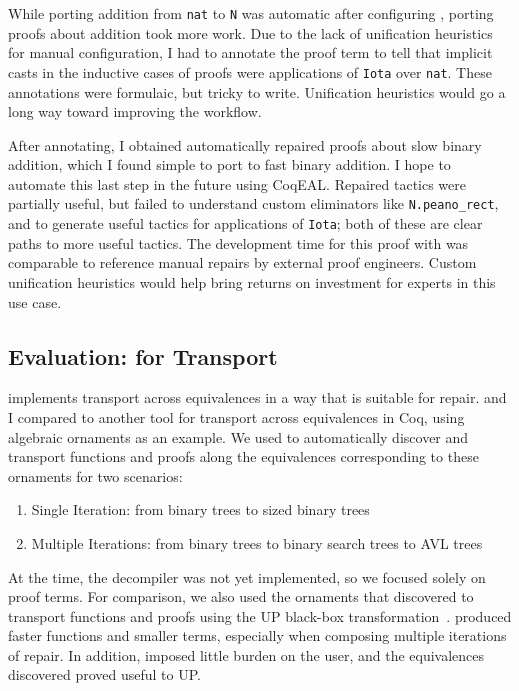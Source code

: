 While porting addition from \lstinline{nat} to \lstinline{N} was automatic after configuring \toolnamec,
porting proofs about addition took more work.
Due to the lack of unification heuristics for manual configuration,
I had to annotate the proof term to tell \toolnamec that implicit casts in the inductive cases of proofs were applications of \lstinline{Iota}
over \lstinline{nat}.
These annotations were formulaic, but tricky to write.
Unification heuristics would go a long way toward improving the workflow. %

After annotating, I obtained automatically repaired proofs about slow binary addition,
which I found simple to port to fast binary addition.
I hope to automate this last step in the future using CoqEAL. %
Repaired tactics were partially useful, but failed to understand custom eliminators like \lstinline{N.peano_rect}, and to generate useful
tactics for applications of \lstinline{Iota}; both of these are clear paths to more useful tactics.
The development time for this proof with \toolnamec was comparable to reference manual repairs by external proof engineers.
Custom unification heuristics would help bring returns on investment for experts in this use case.

\subsection{Evaluation: \toolnamec for Transport}
\label{sec:eval}

\toolnamec implements transport across equivalences in a way that is suitable for repair.
 and I compared \toolnamec to another tool for transport across equivalences in Coq,
using algebraic ornaments as an example.
We used \toolnamec to automatically discover and transport functions and proofs along the equivalences
corresponding to these ornaments for two scenarios:

\begin{enumerate}
\item Single Iteration: from binary trees to sized binary trees
\item Multiple Iterations: from binary trees to binary search trees to AVL trees
\end{enumerate}
At the time, the decompiler was not yet implemented, so we focused solely on proof terms.
For comparison, we also used the ornaments that \toolnamec discovered to transport functions
and proofs using the UP black-box transformation~\cite{tabareau2017equivalences}.
\toolnamec produced faster functions and smaller terms, especially when composing multiple iterations of repair.
In addition, \toolnamec imposed little burden on the user, and the equivalences \toolnamec discovered proved useful to UP.

